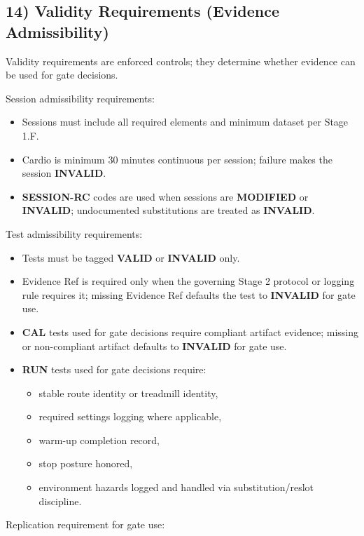\documentclass[10pt]{article}
\begin{document}
\subsection*{14) Validity Requirements (Evidence Admissibility)}

Validity requirements are enforced controls; they determine whether evidence can be used for gate decisions.

Session admissibility requirements:

\begin{itemize}
\item Sessions must include all required elements and minimum dataset per Stage 1.F.
\item Cardio is minimum 30 minutes continuous per session; failure makes the session \textbf{INVALID}.
\item \textbf{SESSION-RC} codes are used when sessions are \textbf{MODIFIED} or \textbf{INVALID}; undocumented substitutions are treated as \textbf{INVALID}.
\end{itemize}

Test admissibility requirements:

\begin{itemize}
\item Tests must be tagged \textbf{VALID} or \textbf{INVALID} only.
\item Evidence Ref is required only when the governing Stage 2 protocol or logging rule requires it; missing Evidence Ref defaults the test to \textbf{INVALID} for gate use.
\item \textbf{CAL} tests used for gate decisions require compliant artifact evidence; missing or non-compliant artifact defaults to \textbf{INVALID} for gate use.
\item \textbf{RUN} tests used for gate decisions require:
  \begin{itemize}
  \item stable route identity or treadmill identity,
  \item required settings logging where applicable,
  \item warm-up completion record,
  \item stop posture honored,
  \item environment hazards logged and handled via substitution/reslot discipline.
  \end{itemize}
\end{itemize}

Replication requirement for gate use:
\end{document}
